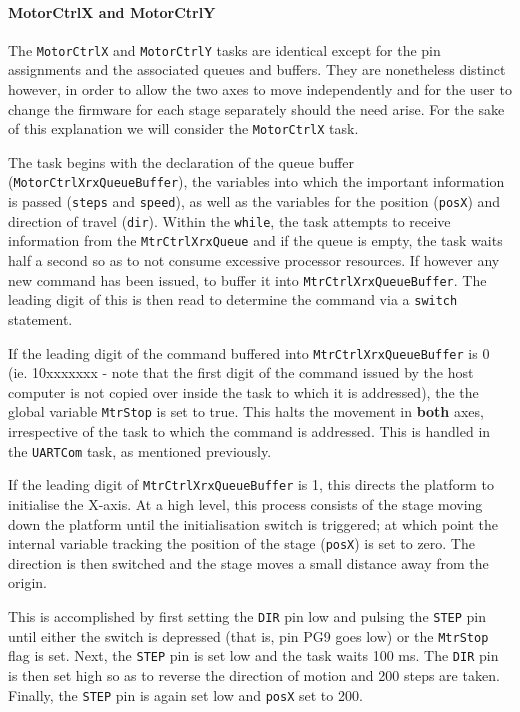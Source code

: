 \paragraph{MotorCtrlX and MotorCtrlY}

The \verb|MotorCtrlX| and \verb|MotorCtrlY| tasks are identical except for the pin assignments and the associated queues and buffers. They are nonetheless distinct however, in order to allow the two axes to move independently and for the user to change the firmware for each stage separately should the need arise. For the sake of this explanation we will consider the \verb|MotorCtrlX| task.

The task begins with the declaration of the queue buffer (\verb|MotorCtrlXrxQueueBuffer|), the variables into which the important information is passed (\verb|steps| and \verb|speed|), as well as the variables for the position (\verb|posX|) and direction of travel (\verb|dir|). Within the \verb|while|, the task attempts to receive information from the \verb|MtrCtrlXrxQueue| and if the queue is empty, the task waits half a second so as to not consume excessive processor resources. If however any new command has been issued, to buffer it into \verb|MtrCtrlXrxQueueBuffer|. The leading digit of this is then read to determine the command via a \verb|switch| statement.

If the leading digit of the command buffered into \verb|MtrCtrlXrxQueueBuffer| is 0 (ie. 10xxxxxxx - note that the first digit of the command issued by the host computer is not copied over inside the task to which it is addressed), the the global variable \verb|MtrStop| is set to true. This halts the movement in \textbf{both} axes, irrespective of the task to which the command is addressed. This is handled in the \verb|UARTCom| task, as mentioned previously.

If the leading digit of \verb|MtrCtrlXrxQueueBuffer| is 1, this directs the platform to initialise the X-axis. At a high level, this process consists of the stage moving down the platform until the initialisation switch is triggered; at which point the internal variable tracking the position of the stage (\verb|posX|) is set to zero. The direction is then switched and the stage moves a small distance away from the origin.

This is accomplished by first setting the \verb|DIR| pin low and pulsing the \verb|STEP| pin until either the switch is depressed (that is, pin PG9 goes low) or the \verb|MtrStop| flag is set. Next, the \verb|STEP| pin is set low and the task waits 100 ms. The \verb|DIR| pin is then set high so as to reverse the direction of motion and 200 steps are taken. Finally, the \verb|STEP| pin is again set low and \verb|posX| set to 200.


